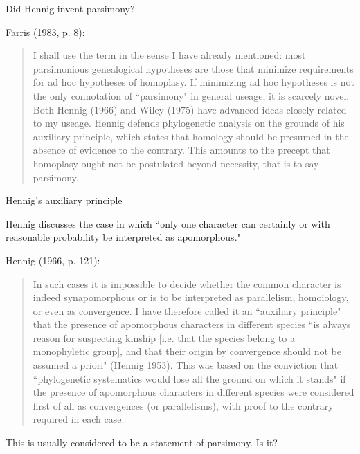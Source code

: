 \documentclass[bluish,slideColor,colorBG,pdf]{prosper}
\begin{document}
\begin{slide}[Replace]{Did Hennig invent parsimony?}

Farris (1983, p. 8):

\begin{quote}
I shall use the term in the sense I have already mentioned: most parsimonious
genealogical hypotheses are those that minimize requirements for ad hoc
hypotheses of homoplasy.  If minimizing ad hoc hypotheses is not the only
connotation of ``parsimony" in general useage, it is scarcely novel.  Both
Hennig (1966) and Wiley (1975) have advanced ideas closely related to my
useage.  Hennig defends phylogenetic analysis on the grounds of his
auxiliary principle, which states that homology should be presumed in the
absence of evidence to the contrary.  This amounts to the precept that
homoplasy ought not be postulated beyond necessity, that is to say
parsimony.
\end{quote}

\end{slide}

\begin{slide}[Replace]{Hennig's auxiliary principle}

Hennig discusses the case in which ``only one character can
certainly or with reasonable probability be interpreted as apomorphous."

Hennig (1966, p. 121):

\begin{quote}
In such cases it is impossible to decide whether the common character
is indeed synapomorphous or is to be interpreted as parallelism, homoiology,
or even as convergence.  I have therefore called it an ``auxiliary principle"
that the presence of apomorphous characters in different species ``is always
reason for suspecting kinship [i.e. that the species belong to a monophyletic
group], and that their origin by convergence should not be assumed a priori"
(Hennig 1953).  This was based on the conviction that ``phylogenetic
systematics would lose all the ground on which it stands" if the presence of
apomorphous characters in different species were considered first of all as
convergences (or parallelisms), with proof to the contrary required in
each case.
\end{quote}

This is usually considered to be a statement of parsimony.  Is it?

\end{slide}
\end{document}
